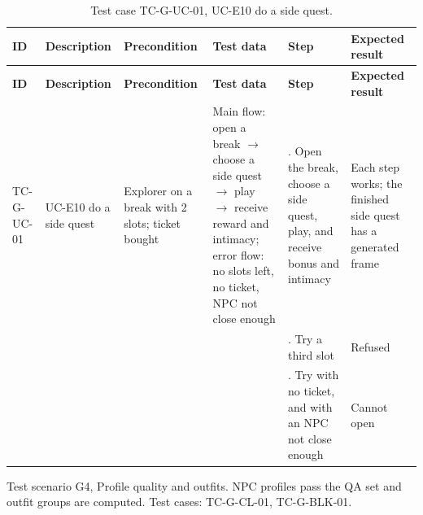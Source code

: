 {\footnotesize{}\renewcommand{\arraystretch}{1.1}
\begin{longtable}{|>{\raggedright\arraybackslash}p{}|>{\raggedright\arraybackslash}p{}|>{\raggedright\arraybackslash}p{}|>{\raggedright\arraybackslash}p{}|>{\raggedright\arraybackslash}p{}|>{\raggedright\arraybackslash}p{}|}
\caption{Test case TC-G-UC-01, UC-E10 do a side quest.} \\
\hline
\textbf{ID} & \textbf{Description} & \textbf{Precondition} & \textbf{Test data} & \textbf{Step} & \textbf{Expected result} \\ \hline
\endfirsthead
\hline
\textbf{ID} & \textbf{Description} & \textbf{Precondition} & \textbf{Test data} & \textbf{Step} & \textbf{Expected result} \\ \hline
\endhead
TC-G-UC-01 & UC-E10 do a side quest & Explorer on a break with 2 slots; ticket bought & Main flow: open a break $\rightarrow$ choose a side quest $\rightarrow$ play $\rightarrow$ receive reward and intimacy; error flow: no slots left, no ticket, NPC not close enough & 1. Open the break, choose a side quest, play, and receive bonus and intimacy & Each step works; the finished side quest has a generated frame \\ \cline{5-6}
 &  &  &  & 2. Try a third slot & Refused \\ \cline{5-6}
 &  &  &  & 3. Try with no ticket, and with an NPC not close enough & Cannot open \\ \hline
\end{longtable}
}

Test scenario G4, Profile quality and outfits. NPC profiles pass the QA set and outfit groups are computed. Test cases: TC-G-CL-01, TC-\allowbreak{}G-\allowbreak{}BLK-\allowbreak{}01.

